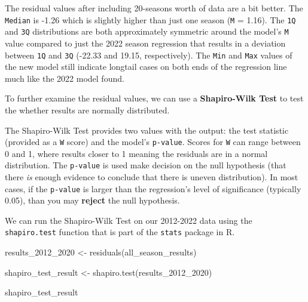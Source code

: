 \documentclass[
  letterpaper,
]{krantz}
\newenvironment{Shaded}{\begin{snugshade}}{\end{snugshade}}
\newcommand{\FunctionTok}[1]{\textcolor[rgb]{0.28,0.35,0.67}{#1}}
\newcommand{\NormalTok}[1]{\textcolor[rgb]{0.00,0.23,0.31}{#1}}
\newcommand{\OtherTok}[1]{\textcolor[rgb]{0.00,0.23,0.31}{#1}}
\begin{document}
The residual values after including 20-seasons worth of data are a bit
better. The \texttt{Median} is -1.26 which is slightly higher than just
one season (\texttt{M} = 1.16). The \texttt{1Q} and \texttt{3Q}
distributions are both approximately symmetric around the model's
\texttt{M} value compared to just the 2022 season regression that
results in a deviation between \texttt{1Q} and \texttt{3Q} (-22.33 and
19.15, respectively). The \texttt{Min} and \texttt{Max} values of the
new model still indicate longtail cases on both ends of the regression
line much like the 2022 model found.

\begin{tcolorbox}[enhanced jigsaw, left=2mm, toprule=.15mm, opacitybacktitle=0.6, leftrule=.75mm, bottomrule=.15mm, colbacktitle=quarto-callout-tip-color!10!white, breakable, colback=white, bottomtitle=1mm, toptitle=1mm, title=\textcolor{quarto-callout-tip-color}{\faLightbulb}\hspace{0.5em}{Tip}, coltitle=black, titlerule=0mm, arc=.35mm, opacityback=0, colframe=quarto-callout-tip-color-frame, rightrule=.15mm]

To further examine the residual values, we can use a
\textbf{Shapiro-Wilk Test} to test the whether results are normally
distributed.

The Shapiro-Wilk Test provides two values with the output: the test
statistic (provided as a \texttt{W} score) and the model's
\texttt{p-value}. Scores for \texttt{W} can range between 0 and 1, where
results closer to 1 meaning the residuals are in a normal distribution.
The \texttt{p-value} is used make decision on the null hypothesis (that
there \emph{is} enough evidence to conclude that there is uneven
distribution). In most cases, if the \texttt{p-value} is larger than the
regression's level of significance (typically 0.05), than you may
\textbf{reject} the null hypothesis.

We can run the Shapiro-Wilk Test on our 2012-2022 data using the
\texttt{shapiro.test} function that is part of the \texttt{stats}
package in R.

\begin{Shaded}
\begin{Highlighting}[]
\NormalTok{results\_2012\_2020 }\OtherTok{\textless{}{-}} \FunctionTok{residuals}\NormalTok{(all\_season\_results)}

\NormalTok{shapiro\_test\_result }\OtherTok{\textless{}{-}} \FunctionTok{shapiro.test}\NormalTok{(results\_2012\_2020)}

\NormalTok{shapiro\_test\_result}
\end{Highlighting}
\end{Shaded}


\end{tcolorbox}
\end{document}

